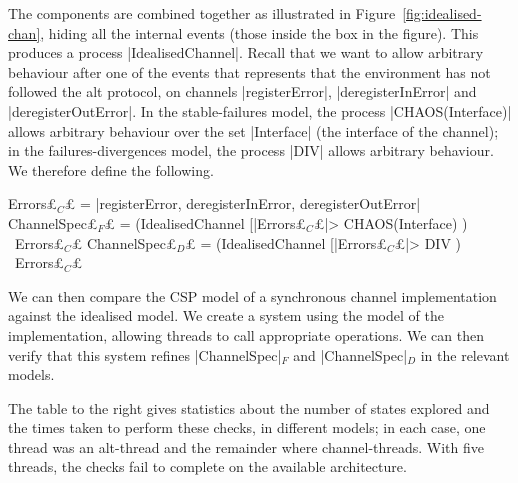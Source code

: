 The components are combined together as illustrated in
Figure~\ref{fig:idealised-chan}, hiding all the internal events (those inside
the box in the figure).  This produces a process |IdealisedChannel|.  Recall
that we want to allow arbitrary behaviour after one of the events that
represents that the environment has not followed the alt protocol, on channels
|registerError|, |deregisterInError| and |deregisterOutError|.  In the
stable-failures model, the process |CHAOS(Interface)| allows arbitrary
behaviour over the set |Interface| (the interface of the channel); in the
failures-divergences model, the process |DIV| allows arbitrary behaviour.  We
therefore define the following.
%
\begin{cspm}
Errors£$_C$£ = {|registerError, deregisterInError, deregisterOutError|}
ChannelSpec£$_F$£ = (IdealisedChannel [|Errors£$_C$£|> CHAOS(Interface) ) \ Errors£$_C$£
ChannelSpec£$_D$£ = (IdealisedChannel [|Errors£$_C$£|> DIV ) \ Errors£$_C$£
\end{cspm}

We can then compare the CSP model of a synchronous channel implementation
against the idealised model.  We create a system using the model of the
implementation, allowing threads to call appropriate operations.  We can then
verify that this system refines |ChannelSpec|$_F$ and |ChannelSpec|$_D$ in the
relevant models.


\begin{window}
%
The table to the right gives statistics about the number of states explored
and the times taken to perform these checks, in different models; in each
case, one thread was an alt-thread and the remainder where channel-threads.
With five threads, the checks fail to complete on the available architecture.
\end{window}
 
